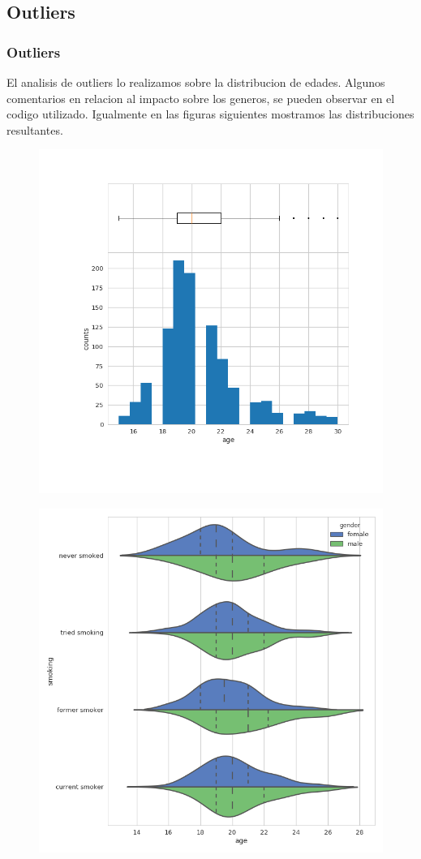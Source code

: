 \documentclass[8pt]{beamer}
\begin{document}
\subsection{Outliers}
\begin{frame}\frametitle{Outliers}
\small{
El analisis de outliers lo realizamos sobre la distribucion de edades. Algunos comentarios en relacion al impacto sobre los generos, se pueden observar en el codigo utilizado. Igualmente en las figuras siguientes mostramos las distribuciones resultantes.} 
\begin{multicols}{2}
 \begin{figure}
 \includegraphics[scale=0.18]{age_hist}
 \end{figure}
 \begin{figure}
 \includegraphics[scale=0.18]{smoking_dist_woo}

\end{figure}
\end{multicols}
\end{frame}
\end{document}
